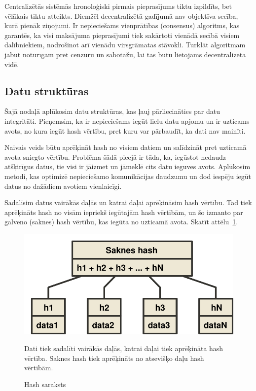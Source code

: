 Centralizētās sistēmās hronoloģiski pirmais pieprasījums tiktu izpildīts, bet vēlākais tiktu atteikts. Diemžēl decentralizētā gadījumā nav objektīva secība, kurā pienāk ziņojumi. Ir nepieciešams vienprātības (consensus) algoritms, kas garantēs, ka visi maksājuma pieprasījumi tiek sakārtoti vienādā secībā visiem dalībniekiem, nodrošinot arī vienādu virsgrāmatas stāvokli.
Turklāt algoritmam jābūt noturīgam pret cenzūru un sabotāžu, lai tas būtu lietojams decentralizētā vidē.

\subsection{Datu struktūras}
Šajā nodaļā aplūkosim datu struktūras, kas ļauj pārliecināties par datu integritāti. Pieņemsim, ka ir nepieciešams iegūt lielu datu apjomu un ir uzticams avots, no kura iegūt hash vērtību, pret kuru var pārbaudīt, ka dati nav mainīti. 

Naivais veids būtu aprēķināt hash no visiem datiem un salīdzināt pret uzticamā avota sniegto vērtību. Problēma šādā pieejā ir tāda, ka, iegūstot nedaudz atšķirīgus datus, tie visi ir jāizmet un jāmeklē cits datu ieguves avots. Aplūkosim metodi, kas optimizē nepieciešamo komunikācijas daudzumu un dod iespēju iegūt datus no dažādiem avotiem vienlaicīgi.

Sadalīsim datus vairākās daļās un katrai daļai aprēķināsim hash vērtību. Tad tiek aprēķināts hash no visām iepriekš iegūtajām hash vērtībām, un šo izmanto par galveno (saknes) hash vērtību, kas iegūta no uzticamā avota. Skatīt attēlu~\ref{fig:hash-list}.

\begin{figure}[htpb]
    \centering
    \includegraphics[scale=0.5]{teorija/hash-list.pdf}
    \caption{Hash saraksts}
    Dati tiek sadalīti vairākās daļās, katrai daļai tiek aprēķināta hash vērtība. Saknes hash tiek aprēķināts no atsevišķo daļu hash vērtībām.
\label{fig:hash-list}
\end{figure}

